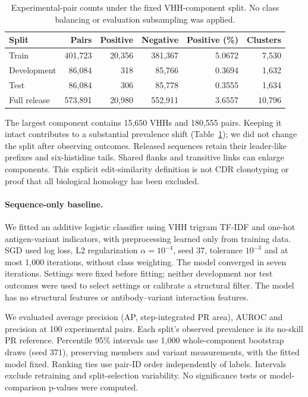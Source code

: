 \documentclass[11pt, logo, nonumbering]{preprint}
\begin{document}
\begin{table}[htbp]
\centering\small
\begin{tabular}{@{}lrrrrr@{}}
\toprule
Split & Pairs & Positive & Negative & Positive (\%) & Clusters \\
\midrule
Train & 401,723 & 20,356 & 381,367 & 5.0672 & 7,530 \\
Development & 86,084 & 318 & 85,766 & 0.3694 & 1,632 \\
Test & 86,084 & 306 & 85,778 & 0.3555 & 1,634 \\
\midrule
Full release & 573,891 & 20,980 & 552,911 & 3.6557 & 10,796 \\
\bottomrule
\end{tabular}
\caption{Experimental-pair counts under the fixed VHH-component split. No
class balancing or evaluation subsampling was applied.}
\label{tab:rq1-splits}
\end{table}

The largest component contains 15,650 VHHs and 180,555 pairs. Keeping it intact
contributes to a substantial prevalence shift (Table~\ref{tab:rq1-splits}); we
did not change the split after observing outcomes. Released sequences retain
their leader-like prefixes and six-histidine tails. Shared flanks and transitive
links can enlarge components. This explicit edit-similarity definition is not
CDR clonotyping or proof that all biological homology has been excluded.

\paragraph{Sequence-only baseline.}
We fitted an additive logistic classifier using VHH trigram TF-IDF and one-hot
antigen-variant indicators, with preprocessing learned only from training data.
SGD used log loss, L2 regularization $\alpha=10^{-4}$, seed 37, tolerance
$10^{-3}$ and at most 1,000 iterations, without class weighting. The model
converged in seven iterations. Settings were fixed before fitting; neither
development nor test outcomes were used to select settings or calibrate a
structural filter. The model has no structural features or antibody--variant
interaction features.

We evaluated average precision (AP, step-integrated PR area), AUROC and
precision at 100 experimental pairs. Each split's observed prevalence is its
no-skill PR reference. Percentile 95\% intervals use 1,000 whole-component
bootstrap draws (seed 371), preserving members and variant measurements, with
the fitted model fixed. Ranking ties use pair-ID order independently of labels.
Intervals exclude retraining and split-selection variability. No significance
tests or model-comparison p-values were computed.
\end{document}
